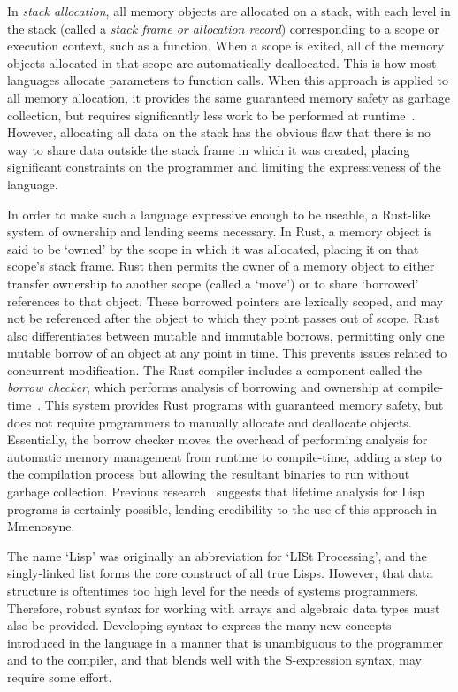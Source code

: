 In \textit{stack allocation}, all memory objects are allocated on a stack, with each level in the stack (called a \textit{stack frame or \textit{allocation record}}) corresponding to a scope or execution context, such as a function. When a scope is exited, all of the memory objects allocated in that scope are automatically deallocated. This is how most languages allocate parameters to function calls. When this approach is applied to all memory allocation, it provides the same guaranteed memory safety as garbage collection, but requires significantly less work to be performed at runtime~\cite{Corry:2006:OSA:1133956.1133978,Hanson:1990:ESA:91556.91603}. However, allocating all data on the stack has the obvious flaw that there is no way to share data outside the stack frame in which it was created, placing significant constraints on the programmer and limiting the expressiveness of the language.

In order to make such a language expressive enough to be useable, a Rust-like system of ownership and lending seems necessary. In Rust, a memory object is said to be `owned' by the scope in which it was allocated, placing it on that scope's stack frame. Rust then permits the owner of a memory object to either transfer ownership to another scope (called a `move') or to share `borrowed' references to that object. These borrowed pointers are lexically scoped, and may not be referenced after the object to which they point passes out of scope. Rust also differentiates between mutable and immutable borrows, permitting only one mutable borrow of an object at any point in time. This prevents issues related to concurrent modification. The Rust compiler includes a component called the \textit{borrow checker}, which performs analysis of borrowing and ownership at compile-time~\cite{Matsakis:2014:RL:2663171.2663188,whyrust}. This system provides Rust programs with guaranteed memory safety, but does not require programmers to manually allocate and deallocate objects. Essentially, the borrow checker moves the overhead of performing analysis for automatic memory management from runtime to compile-time, adding a step to the compilation process but allowing the resultant binaries to run without garbage collection.
Previous research~\cite{sobalvarro1988lifetime} suggests that lifetime analysis for Lisp programs is certainly possible, lending credibility to the use of this approach in Mmenosyne.

The name `Lisp' was originally an abbreviation for `LISt Processing', and the singly-linked list forms the core construct of all true Lisps. However, that data structure is oftentimes too high level for the needs of systems programmers. Therefore, robust syntax for working with arrays and algebraic data types must also be provided. Developing syntax to express the many new concepts introduced in the language in a manner that is unambiguous to the programmer and to the compiler, and that blends well with the S-expression syntax, may require some effort.

